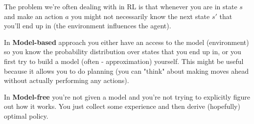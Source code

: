 The problem we're often dealing with in RL is that whenever you are in state $s$ and make 
an action $a$ you might not necessarily know the next state $s′$ that you'll end up in 
(the environment influences the agent).

In {\bf Model-based} approach you either have an access to the model (environment) so you 
know the probability distribution over states that you end up in, or you first try to build 
a model (often - approximation) yourself. This might be useful because it allows you to do 
planning (you can "think" about making moves ahead without actually performing any actions).

In {\bf Model-free} you're not given a model and you're not trying to explicitly figure out 
how it works. You just collect some experience and then derive (hopefully) optimal policy.



